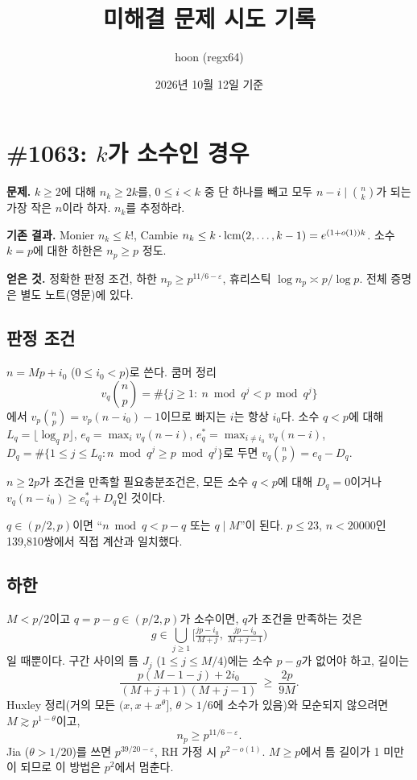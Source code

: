 \documentclass[11pt]{article}
\title{미해결 문제 시도 기록}
\author{hoon (regx64)}
\date{2026년 10월 12일 기준}
\begin{document}
\maketitle
\tableofcontents

\section{\Erdos{} \#1063: $k$가 소수인 경우}
\textbf{문제.} $k\ge2$에 대해 $n_k\ge2k$를, $0\le i<k$ 중 단 하나를 빼고 모두 $n-i\mid\binom nk$가 되는 가장 작은 $n$이라 하자. $n_k$를 추정하라.

\textbf{기존 결과.} Monier $n_k\le k!$, Cambie $n_k\le k\cdot\operatorname{lcm}(2,\dots,k-1)=e^{(1+o(1))k}$. 소수 $k=p$에 대한 하한은 $n_p\ge p$ 정도.

\textbf{얻은 것.} 정확한 판정 조건, 하한 $n_p\ge p^{11/6-\varepsilon}$, 휴리스틱 $\log n_p\asymp p/\log p$. 전체 증명은 별도 노트(영문)에 있다.

\subsection{판정 조건}
$n=Mp+i_0$ ($0\le i_0<p$)로 쓴다. 쿰머 정리
\[
v_q\binom np=\#\{j\ge1:\ n\bmod q^j<p\bmod q^j\}
\]
에서 $v_p\binom np=v_p(n-i_0)-1$이므로 빠지는 $i$는 항상 $i_0$다. 소수 $q<p$에 대해 $L_q=\lfloor\log_qp\rfloor$,
$e_q=\max_iv_q(n-i)$, $e_q^*=\max_{i\ne i_0}v_q(n-i)$, $D_q=\#\{1\le j\le L_q:n\bmod q^j\ge p\bmod q^j\}$로 두면 $v_q\binom np=e_q-D_q$.

\begin{theorem}
$n\ge2p$가 조건을 만족할 필요충분조건은, 모든 소수 $q<p$에 대해 $D_q=0$이거나 $v_q(n-i_0)\ge e_q^*+D_q$인 것이다.
\end{theorem}
$q\in(p/2,p)$이면 ``$n\bmod q<p-q$ 또는 $q\mid M$''이 된다. $p\le23$, $n<20000$인 139{,}810쌍에서 직접 계산과 일치했다.

\subsection{하한}
$M<p/2$이고 $q=p-g\in(p/2,p)$가 소수이면, $q$가 조건을 만족하는 것은
\[
g\in\bigcup_{j\ge1}\Big[\tfrac{jp-i_0}{M+j},\ \tfrac{jp-i_0}{M+j-1}\Big)
\]
일 때뿐이다. 구간 사이의 틈 $J_j$ ($1\le j\le M/4$)에는 소수 $p-g$가 없어야 하고, 길이는
\[
\frac{p(M-1-j)+2i_0}{(M+j+1)(M+j-1)}\ \ge\ \frac{2p}{9M}.
\]
Huxley 정리(거의 모든 $(x,x+x^{\theta}]$, $\theta>1/6$에 소수가 있음)와 모순되지 않으려면 $M\gtrsim p^{1-\theta}$이고,
\[
n_p\ge p^{11/6-\varepsilon}.
\]
Jia ($\theta>1/20$)를 쓰면 $p^{39/20-\varepsilon}$, RH 가정 시 $p^{2-o(1)}$. $M\ge p$에서 틈 길이가 1 미만이 되므로 이 방법은 $p^2$에서 멈춘다.
\end{document}
